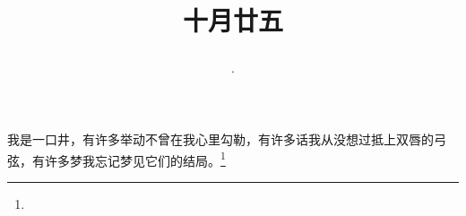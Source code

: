 \title{\date[d=25,m=11,y=2024][year:cn-y,年,month:cn,day:cn,日,·,weekday]·十月廿五 }
我是一口井，有许多举动不曾在我心里勾勒，有许多话我从没想过抵上双唇的弓弦，有许多梦我忘记梦见它们的结局。\footnote{ }

